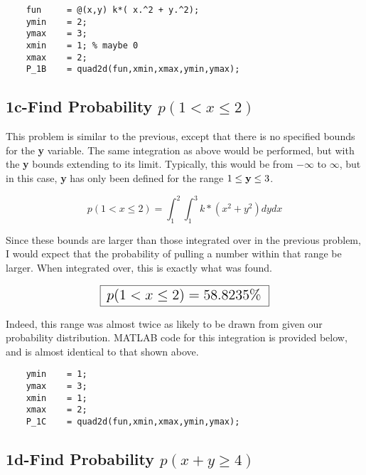 \documentclass[]{article}
\begin{document}
\begin{lstlisting}
	fun     = @(x,y) k*( x.^2 + y.^2);
	ymin    = 2;
	ymax    = 3;
	xmin    = 1; % maybe 0
	xmax    = 2;
	P_1B    = quad2d(fun,xmin,xmax,ymin,ymax);
\end{lstlisting}





\subsection*{1c-Find Probability $ p(1<x\le{2})   $}

This problem is similar to the previous, except that there is no specified bounds for the {\bf y} variable. The same integration as above would be performed, but with the {\bf y} bounds extending to its limit. Typically, this would be from $ -\infty $ to $ \infty $, but in this case, {\bf y} has only been defined for the range $ 1 \le {\bf y} \le 3 $.

\begin{displaymath}
	p(  1<x\le{2}  ) = \int_1^2{\int_1^3 {k*(x^2+y^2)   dy} dx }
\end{displaymath}  

\noindent Since these bounds are larger than those integrated over in the previous problem, I would expect that the probability of pulling a number within that range be larger. When integrated over, this is exactly what was found. 


\begin{displaymath}
	\fbox{    \Large $p(  1<x\le{2}  ) = 58.8235\%$   }
\end{displaymath}  

\noindent Indeed, this range was almost twice as likely to be drawn from given our probability distribution. MATLAB code for this integration is provided below, and is almost identical to that shown above. 

\begin{lstlisting}
	ymin    = 1;
	ymax    = 3;
	xmin    = 1; 
	xmax    = 2;
	P_1C    = quad2d(fun,xmin,xmax,ymin,ymax);
\end{lstlisting}




\subsection*{1d-Find Probability $ p(x+y \ge 4 )   $}
\end{document}
